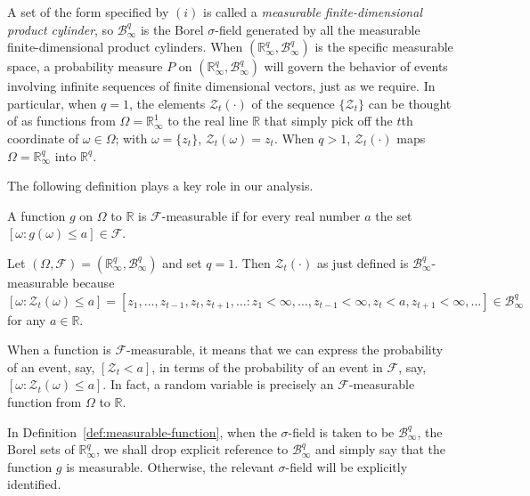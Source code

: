 A set of the form specified by $(i)$ is called a \emph{measurable finite-dimensional product cylinder}, so $\mathcal{B}_\infty^q$ is the Borel $\sigma$-field generated by all the measurable finite-dimensional product cylinders. When $(\mathbb{R}_\infty^q, \mathcal{B}_\infty^q)$ is the specific measurable space, a probability measure $P$ on $(\mathbb{R}_\infty^q, \mathcal{B}_\infty^q)$ will govern the behavior of events involving infinite sequences of finite dimensional vectors, just as we require. In particular, when $q = 1$, the elements $\mathcal{Z}_t(\cdot)$ of the sequence $\{\mathcal{Z}_t\}$ can be thought of as functions from $\Omega = \mathbb{R}_\infty^1$ to the real line $\mathbb{R}$ that simply pick off the $t$th coordinate of $\omega \in \Omega$; with $\omega = \{z_t\}$, $\mathcal{Z}_t(\omega) = z_t$. When $q > 1$, $\boldsymbol{\mathcal{Z}}_t(\cdot)$ maps $\Omega = \mathbb{R}_\infty^q$ into $\mathbb{R}^q$.

The following definition plays a key role in our analysis.

\begin{definition}\label{def:measurable-function}
A function $g$ on $\Omega$ to $\mathbb{R}$ is $\mathcal{F}$-measurable if for every real number $a$ the set $[\omega : g(\omega) \leq a] \in \mathcal{F}$.
\end{definition}

\begin{example}\label{ex:measurable-zt}
Let $(\Omega, \mathcal{F}) = (\mathbb{R}_\infty^q, \mathcal{B}_\infty^q)$ and set $q = 1$. Then $\mathcal{Z}_t(\cdot)$ as just defined is $\mathcal{B}_\infty^q$-measurable because $[\omega : \mathcal{Z}_t(\omega) \leq a] = [z_1, \ldots, z_{t-1}, z_t, z_{t+1}, \ldots : z_1 < \infty, \ldots, z_{t-1} < \infty, z_t < a, z_{t+1} < \infty, \ldots] \in \mathcal{B}_\infty^q$ for any $a \in \mathbb{R}$.
\end{example}

When a function is $\mathcal{F}$-measurable, it means that we can express the probability of an event, say, $[\mathcal{Z}_t < a]$, in terms of the probability of an event in $\mathcal{F}$, say, $[\omega : \mathcal{Z}_t(\omega) \leq a]$. In fact, a random variable is precisely an $\mathcal{F}$-measurable function from $\Omega$ to $\mathbb{R}$.

In Definition~\ref{def:measurable-function}, when the $\sigma$-field is taken to be $\mathcal{B}_\infty^q$, the Borel sets of $\mathbb{R}_\infty^q$, we shall drop explicit reference to $\mathcal{B}_\infty^q$ and simply say that the function $g$ is measurable. Otherwise, the relevant $\sigma$-field will be explicitly identified.

